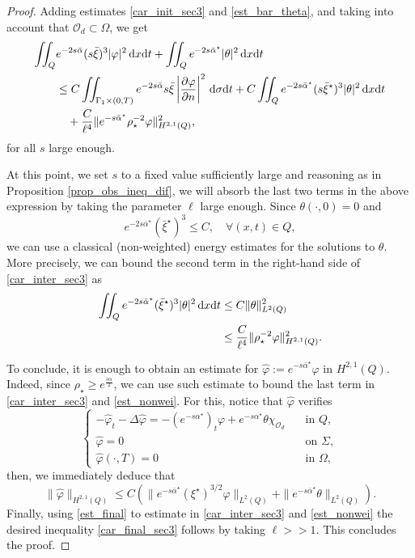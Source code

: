 \documentclass{dcds-bOF}
\theoremstyle{definition}
\def\dx{\,\textnormal{d}x}
\def\dt{\textnormal{d}t}
\def\d{\,\textnormal{d}}
\begin{document}
\begin{proof}
Adding estimates \eqref{car_init_sec3} and \eqref{est_bar_theta}, and taking into account that $\mathcal O_d\subset\Omega$, we get
%
\begin{align} \notag
\iint_{Q}&e^{-2s\bar\alpha}(s\bar\xi)^3|\varphi|^2\dx\dt+\iint_{Q}e^{-2s\bar\alpha^\star}|\theta|^2\dx\dt \\ \label{car_inter_sec3}
&\leq C\iint_{\Gamma_1\times(0,T)}e^{-2s\bar\alpha}s\bar\xi\left|\frac{\partial \varphi}{\partial n}\right|^2\d\sigma\dt+C\iint_{Q}e^{-2s\bar\alpha^\star}(s\bar\xi^\star)^3|\theta|^2\dx\dt\\
&\quad +\frac{C}{\ell^4}\|e^{-s\bar\alpha^\star}\rho_\star^{-2}\varphi\|^2_{H^{2,1}(Q)},
\end{align}
%
for all $s$ large enough.

At this point, we set $s$ to a fixed value sufficiently large and reasoning as in Proposition \ref{prop_obs_ineq_dif}, we will absorb the last two terms in the above expression by taking the parameter $\ell$ large enough. Since $\theta(\cdot,0)=0$ and
%
\begin{equation*}
e^{-2s\bar\alpha^\star}({\bar\xi^\star})^3\leq C, \quad \forall (x,t)\in Q,
\end{equation*}
%
we can use a classical (non-weighted) energy estimates for the solutions to $\theta$. More precisely, we can bound the second term in the right-hand side of \eqref{car_inter_sec3} as
%
\begin{align}\notag
\iint_{Q}e^{-2s\bar\alpha^\star}({\bar\xi^\star})^3|\theta|^2\dx\dt&\leq C\|\theta\|^2_{L^2(Q)}  \\ \label{est_nonwei}
&\leq \frac{C}{\ell^4}\|\rho_\star^{-2}\varphi\|^2_{H^{2,1}(Q)}.
\end{align}
%

To conclude, it is enough to obtain an estimate for $\widehat{\varphi}:=e^{-s\bar\alpha^\star}\varphi$ in $H^{2,1}(Q)$. Indeed, since $\rho_\star\geq e^{\frac{s\alpha}{2}}$, we can use such estimate to bound the last term in \eqref{car_inter_sec3} and \eqref{est_nonwei}. For this, notice that $\widehat{\varphi}$ verifies
%
\begin{equation*}%
\begin{cases}
-\widehat\varphi_t-\Delta \widehat\varphi=-(e^{-s\alpha^\star})_t\varphi+e^{-s\alpha^\star}\theta\chi_{\mathcal O_d} &\quad \text{in } Q, \\
\widehat\varphi=0 &\quad \text{on } \Sigma, \\
\widehat{\varphi}(\cdot,T)=0 &\quad\text{in } \Omega,
\end{cases}
\end{equation*}
%
then, we immediately deduce that
%
\begin{equation}\label{est_final}
\|\widehat{\varphi}\|_{H^{2,1}(Q)}\leq C\left(\|e^{-s\bar\alpha^\star}(\xi^\star)^{3/2}\varphi\|_{L^2(Q)}+\|e^{-s\bar\alpha^\star}\theta\|_{L^2(Q)}\right).
\end{equation}
%
Finally, using \eqref{est_final} to estimate in \eqref{car_inter_sec3} and \eqref{est_nonwei} the desired inequality \eqref{car_final_sec3} follows by taking $\ell>>1$. This concludes the proof.
%
\end{proof}
\end{document}
